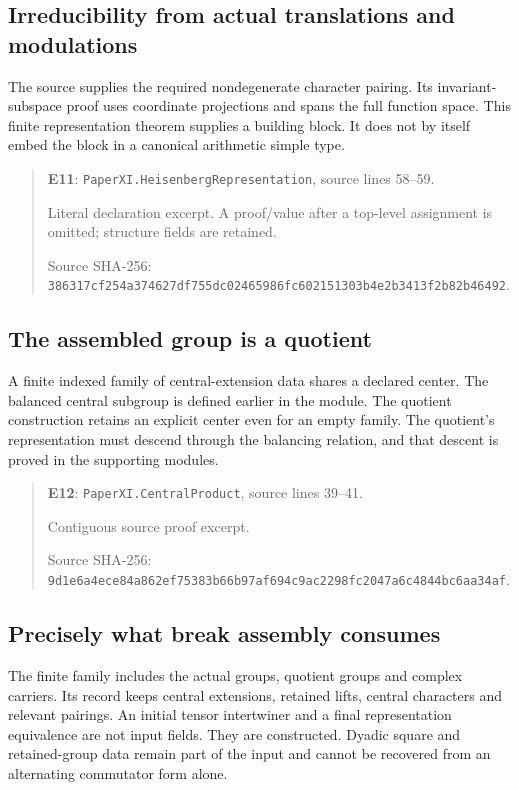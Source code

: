 \documentclass[10pt,oneside]{book}
\begin{document}
\subsection{Irreducibility from actual translations and modulations}
\label{guide:E11}
The source supplies the required nondegenerate character pairing. Its invariant-subspace proof uses coordinate projections and spans the full function space.
This finite representation theorem supplies a building block. It does not by itself embed the block in a canonical arithmetic simple type.

\begin{quote}\footnotesize\textbf{E11}: \nolinkurl{PaperXI.HeisenbergRepresentation}, source lines 58--59.\par Literal declaration excerpt. A proof/value after a top-level assignment is omitted; structure fields are retained.\par Source SHA-256: {\scriptsize\texttt{386317cf254a374627df755dc02465986fc602151303b4e2b3413f2b82b46492}}.\end{quote}


\subsection{The assembled group is a quotient}
\label{guide:E12}
A finite indexed family of central-extension data shares a declared center. The balanced central subgroup is defined earlier in the module.
The quotient construction retains an explicit center even for an empty family. The quotient's representation must descend through the balancing relation, and that descent is proved in the supporting modules.

\begin{quote}\footnotesize\textbf{E12}: \nolinkurl{PaperXI.CentralProduct}, source lines 39--41.\par Contiguous source proof excerpt.\par Source SHA-256: {\scriptsize\texttt{9d1e6a4ece84a862ef75383b66b97af694c9ac2298fc2047a6c4844bc6aa34af}}.\end{quote}


\subsection{Precisely what break assembly consumes}
\label{guide:E13}
The finite family includes the actual groups, quotient groups and complex carriers. Its record keeps central extensions, retained lifts, central characters and relevant pairings.
An initial tensor intertwiner and a final representation equivalence are not input fields. They are constructed. Dyadic square and retained-group data remain part of the input and cannot be recovered from an alternating commutator form alone.
\end{document}
